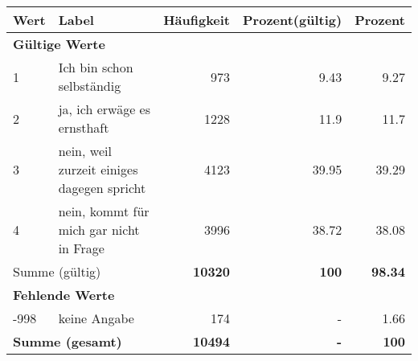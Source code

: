      \begin{longtable}{lXrrr}
     \toprule
     \textbf{Wert} & \textbf{Label} & \textbf{Häufigkeit} & \textbf{Prozent(gültig)} & \textbf{Prozent} \\
     \endhead
     \midrule
     \multicolumn{5}{l}{\textbf{Gültige Werte}}\\

     1 &
     \multicolumn{1}{X}{ Ich bin schon selbständig   } &


       \num{973} &
       \num[round-mode=places,round-precision=2]{9.43} &
         \num[round-mode=places,round-precision=2]{9.27} \\

     2 &
     \multicolumn{1}{X}{ ja, ich erwäge es ernsthaft   } &


       \num{1228} &
       \num[round-mode=places,round-precision=2]{11.9} &
         \num[round-mode=places,round-precision=2]{11.7} \\

     3 &
     \multicolumn{1}{X}{ nein, weil zurzeit einiges dagegen spricht   } &


       \num{4123} &
       \num[round-mode=places,round-precision=2]{39.95} &
         \num[round-mode=places,round-precision=2]{39.29} \\

     4 &
     \multicolumn{1}{X}{ nein, kommt für mich gar nicht in Frage   } &


       \num{3996} &
       \num[round-mode=places,round-precision=2]{38.72} &
         \num[round-mode=places,round-precision=2]{38.08} \\
     \midrule
     \multicolumn{2}{l}{Summe (gültig)} &
       \textbf{\num{10320}} &
     \textbf{\num{100}} &
       \textbf{\num[round-mode=places,round-precision=2]{98.34}} \\
     \multicolumn{5}{l}{\textbf{Fehlende Werte}}\\
       -998 &
       keine Angabe &
         \num{174} &
        - &
         \num[round-mode=places,round-precision=2]{1.66} \\
     \midrule
     \multicolumn{2}{l}{\textbf{Summe (gesamt)}} &
          \textbf{\num{10494}} &
        \textbf{-} &
        \textbf{\num{100}} \\
     \bottomrule
     \end{longtable}
     
